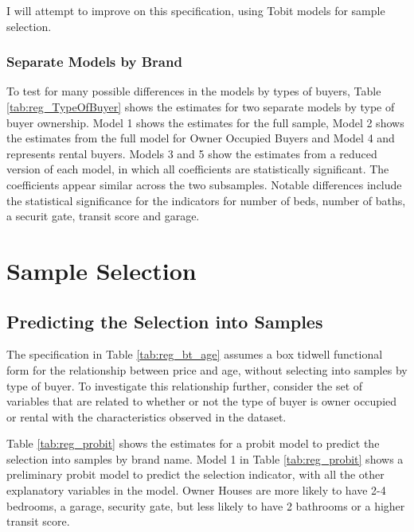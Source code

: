 % 

% 

I will attempt to improve on this specification, 
using Tobit models for sample selection. 

\clearpage
\subsubsection{Separate Models by Brand}

To test for many possible differences in the 
models by types of buyers, 
Table \ref{tab:reg_TypeOfBuyer}
shows the estimates for two separate models
by type of buyer ownership.
%
Model 1 shows the estimates for 
the full sample,
Model 2 shows the estimates from the full model for 
Owner Occupied Buyers
and Model 4 and
represents rental buyers. 
% 
Models 3 and 5 show the estimates from a reduced version of each model, 
in which all coefficients are statistically significant. 
% 
The coefficients appear similar across the two subsamples.
Notable differences include the statistical significance for 
the indicators for number of beds, number of baths, a securit gate, transit score and garage.




\clearpage
\section{Sample Selection}


\subsection{Predicting the Selection into Samples}


The specification in 
Table \ref{tab:reg_bt_age}
assumes a box tidwell functional form for
the relationship between price and age, 
without selecting into samples by type of buyer.
% 
To investigate this relationship further, 
consider the set of variables that are related to
whether or not the type of buyer is owner occupied or rental
with the characteristics observed in the dataset. 



Table \ref{tab:reg_probit} 
shows the estimates for a probit model to predict the selection
into samples by brand name.
% 
Model 1 in Table \ref{tab:reg_probit} 
shows a preliminary probit model to predict the selection indicator,
with all the other explanatory variables in the model.
Owner Houses are more likely to have 2-4 bedrooms, 
a garage, security gate, but less likely to have 2 bathrooms or a higher 
transit score.


